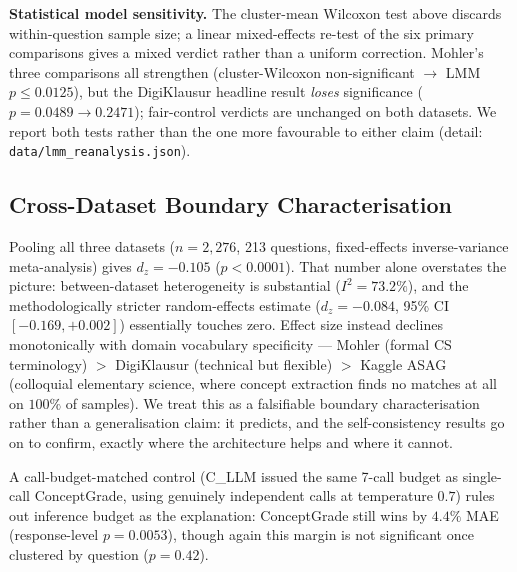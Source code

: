 \documentclass[conference]{IEEEtran}
\begin{document}
\textbf{Statistical model sensitivity.} The cluster-mean Wilcoxon test
above discards within-question sample size; a linear mixed-effects
re-test of the six primary comparisons gives a mixed verdict rather
than a uniform correction. Mohler's three comparisons all strengthen
(cluster-Wilcoxon non-significant $\to$ LMM $p\le0.0125$), but the
DigiKlausur headline result \emph{loses} significance
($p=0.0489\to0.2471$); fair-control verdicts are unchanged on both
datasets. We report both tests rather than the one more favourable to
either claim (detail: \texttt{data/lmm\_reanalysis.json}).

\subsection{Cross-Dataset Boundary Characterisation}
Pooling all three datasets ($n=2{,}276$, 213 questions, fixed-effects
inverse-variance meta-analysis) gives $d_z=-0.105$ ($p<0.0001$). That
number alone overstates the picture: between-dataset heterogeneity is
substantial ($I^2=73.2\%$), and the methodologically stricter
random-effects estimate ($d_z=-0.084$, 95\% CI $[-0.169,+0.002]$)
essentially touches zero. Effect size instead declines monotonically
with domain vocabulary specificity — Mohler (formal CS terminology) $>$
DigiKlausur (technical but flexible) $>$ Kaggle ASAG (colloquial
elementary science, where concept extraction finds no matches at all on
$100\%$ of samples). We treat this as a falsifiable boundary
characterisation rather than a generalisation claim: it predicts, and
the self-consistency results go on to confirm, exactly where the
architecture helps and where it cannot.

A call-budget-matched control (C\_LLM issued the same 7-call budget as
single-call ConceptGrade, using genuinely independent calls at
temperature $0.7$) rules out inference budget as the explanation:
ConceptGrade still wins by $4.4\%$ MAE (response-level $p=0.0053$),
though again this margin is not significant once clustered by question
($p=0.42$).
\end{document}
